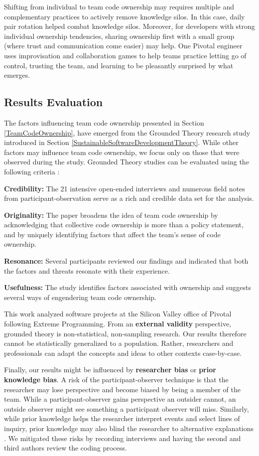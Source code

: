 Shifting from individual to team code ownership may requires multiple and complementary practices to actively remove knowledge silos. In this case, daily pair rotation helped combat knowledge silos. Moreover, for developers with strong individual ownership tendencies, sharing ownership first with a small group (where trust and communication come easier) may help. One Pivotal engineer uses improvisation and collaboration games to help teams practice letting go of control, trusting the team, and learning to be pleasantly surprised by what emerges. 

\subsection{Results Evaluation}

The factors influencing team code ownership presented in Section \ref{TeamCodeOwnership}, have emerged from the Grounded Theory research study introduced in Section \ref{SustainableSoftwareDevelopmentTheory}. While other factors may influence team code ownership, we focus only on those that were observed during the study. Grounded Theory studies can be evaluated using the following criteria \cite{Charmaz}: 

\textbf{Credibility:}  The 21 intensive open-ended interviews and numerous field notes from participant-observation serve as a rich and credible data set for the analysis. 

\textbf{Originality:} The paper broadens the idea of team code ownership by acknowledging that collective code ownership is more than a policy statement, and by uniquely identifying factors that affect the team's sense of code ownership.

\textbf{Resonance:} Several participants reviewed our findings and indicated that both the factors and threats resonate with their experience.

\textbf{Usefulness:} The study identifies factors associated with ownership and suggests several ways of engendering team code ownership.

This work analyzed software projects at the Silicon Valley office of Pivotal following Extreme Programming. From an \textbf{external validity} perspective, grounded theory is non-statistical, non-sampling research. Our results therefore cannot be statistically generalized to a population. Rather, researchers and professionals can adapt the concepts and ideas to other contexts case-by-case. 

Finally, our results might be influenced by \textbf{researcher bias} or \textbf{prior knowledge bias}. A risk of the participant-observer technique is that the researcher may lose perspective and become biased by being a member of the team. While a participant-observer gains perspective an outsider cannot, an outside observer might see something a participant observer will miss. Similarly, while prior knowledge helps the researcher interpret events and select lines of inquiry, prior knowledge may also blind the researcher to alternative explanations \cite{GlaserIssues}. We mitigated these risks by recording interviews and having the second and third authors review the coding process. 


